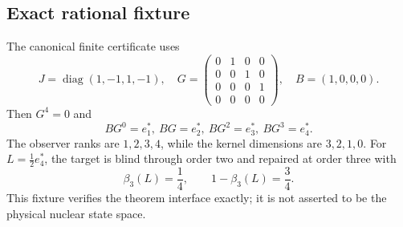 \subsection{Exact rational fixture}

The canonical finite certificate uses
\[
 J=\operatorname{diag}(1,-1,1,-1),
\quad
 G=\begin{pmatrix}
0&1&0&0\\0&0&1&0\\0&0&0&1\\0&0&0&0
\end{pmatrix},
\quad B=(1,0,0,0).
\]
Then $G^4=0$ and
\[
 BG^0=e_1^*,\ BG=e_2^*,\ BG^2=e_3^*,\ BG^3=e_4^*.
\]
The observer ranks are $1,2,3,4$, while the kernel dimensions are $3,2,1,0$. For $L=\frac12e_4^*$, the target is blind through order two and repaired at order three with
\[
 \beta_3(L)=\frac14,
 \qquad
 1-\beta_3(L)=\frac34.
\]
This fixture verifies the theorem interface exactly; it is not asserted to be the physical nuclear state space.
